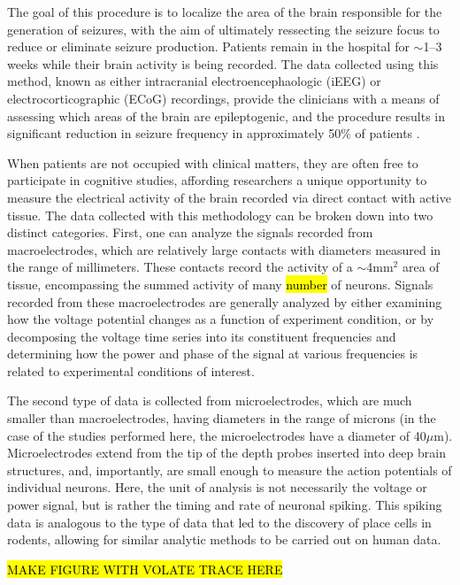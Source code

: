 The goal of this procedure is to localize the area of the brain responsible for the generation of seizures, with the aim of ultimately ressecting the seizure focus to reduce or eliminate seizure production. Patients remain in the hospital for $\sim$1--3 weeks while their brain activity is being recorded. The data collected using this method, known as either intracranial electroencephaologic (iEEG) or electrocorticographic (ECoG) recordings, provide the clinicians with a means of assessing which areas of the brain are epileptogenic, and the procedure results in significant reduction in seizure frequency in approximately 50\% of patients \citep{Kaha06}. 

When patients are not occupied with clinical matters, they are often free to participate in cognitive studies, affording researchers a unique opportunity to measure the electrical activity of the brain recorded via direct contact with active tissue. The data collected with this methodology can be broken down into two distinct categories. First, one can analyze the signals recorded from macroelectrodes, which are relatively large contacts with diameters measured in the range of millimeters. These contacts record the activity of a $\sim$4mm$^{2}$ area of tissue, encompassing the summed activity of many \hl{number} of neurons. Signals recorded from these macroelectrodes are generally analyzed by either examining how the voltage potential changes as a function of experiment condition, or by decomposing the voltage time series into its constituent frequencies and determining how the power and phase of the signal at various frequencies is related to experimental conditions of interest.

The second type of data is collected from microelectrodes, which are much smaller than macroelectrodes, having diameters in the range of microns (in the case of the studies performed here, the microelectrodes have a diameter of 40$\mu$m). Microelectrodes extend from the tip of the depth probes inserted into deep brain structures, and, importantly, are small enough to measure the action potentials of individual neurons. Here, the unit of analysis is not necessarily the voltage or power signal, but is rather the timing and rate of neuronal spiking. This spiking data is analogous to the type of data that led to the discovery of place cells in rodents, allowing for similar analytic methods to be carried out on human data. 

\hl{MAKE FIGURE WITH VOLATE TRACE HERE}


